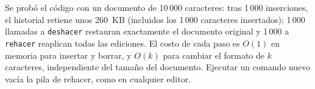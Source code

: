 Se probó el código con un documento de 10\,000 caracteres: tras 1\,000 inserciones, el historial retiene unos 260~KB (incluidos los 1\,000 caracteres insertados); 1\,000 llamadas a \texttt{deshacer} restauran exactamente el documento original y 1\,000 a \texttt{rehacer} reaplican todas las ediciones. El costo de cada paso es \(O(1)\) en memoria para insertar y borrar, y \(O(k)\) para cambiar el formato de \(k\) caracteres, independiente del tamaño del documento. Ejecutar un comando nuevo vacía la pila de rehacer, como en cualquier editor.

